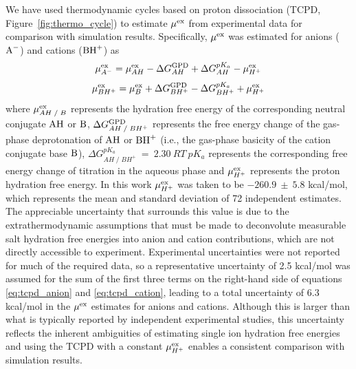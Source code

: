 \documentclass[journal=jacsat,articletitle=true,manuscript=suppinfo,layout=onecolumn]{achemso}
\begin{document}
    We have used thermodynamic cycles based on proton dissociation (TCPD, Figure~\ref{fig:thermo_cycle})\cite{Fossat2021, Lim1991, Pearson1986} to estimate $\mu^{\rm{ex}}$ from experimental data for comparison with simulation results. Specifically, $\mu^{\rm{ex}}$ was estimated for anions ($\ce{A^-}$) and cations ($\ce{BH^+}$) as
    \begin{equation}
    \mu^{\rm{ex}}_{A^-} = \mu^{\rm{ex}}_{AH} - \Delta G^{\rm{GPD}}_{AH} + \Delta G^{pK_a}_{AH} - \mu^{\rm{ex}}_{H^+} 
    \label{eq:tcpd_anion}
    \end{equation}
    \begin{equation}
    \mu^{\rm{ex}}_{BH^+} = \mu^{\rm{ex}}_{B} + \Delta G^{\rm{GPD}}_{BH^+} - \Delta G^{pK_a}_{BH^+} + \mu^{\rm{ex}}_{H^+} 
    \label{eq:tcpd_cation}
    \end{equation}
    where $\mu^{\rm{ex}}_{AH \; / \; B}$ represents the hydration free energy of the corresponding neutral conjugate $\ce{AH}$ or $\ce{B}$, $\Delta G^{\rm{GPD}}_{AH \; / \; BH^+}$ represents the free energy change of the gas-phase deprotonation of $\ce{AH}$ or $\ce{BH^+}$ (i.e., the gas-phase basicity of the cation conjugate base $\ce{B}$), $\Delta G^{pK_a}_{AH \; / \; BH^+}~=~2.30~RT~pK_a$ represents the corresponding free energy change of titration in the aqueous phase and $\mu^{\rm{ex}}_{H^+}$ represents the proton hydration free energy. In this work $\mu^{\rm{ex}}_{H^+}$ was taken to be $-260.9~\pm~5.8$ kcal/mol, which represents the mean and standard deviation of 72 independent estimates.\cite{Fossat2021} The appreciable uncertainty that surrounds this value is due to the extrathermodynamic assumptions that must be made to deconvolute measurable salt hydration free energies into anion and cation contributions, which are not directly accessible to experiment.\cite{Grossfield2003} Experimental uncertainties were not reported for much of the required data, so a representative uncertainty of 2.5 kcal/mol was assumed for the sum of the first three terms on the right-hand side of equations \ref{eq:tcpd_anion} and \ref{eq:tcpd_cation}, leading to a total uncertainty of 6.3 kcal/mol in the $\mu^{\rm{ex}}$ estimates for anions and cations. Although this is larger than what is typically reported by independent experimental studies, this uncertainty reflects the inherent ambiguities of estimating single ion hydration free energies and using the TCPD with a constant $\mu^{\rm{ex}}_{H^+}$ enables a consistent comparison with simulation results.
\end{document}

